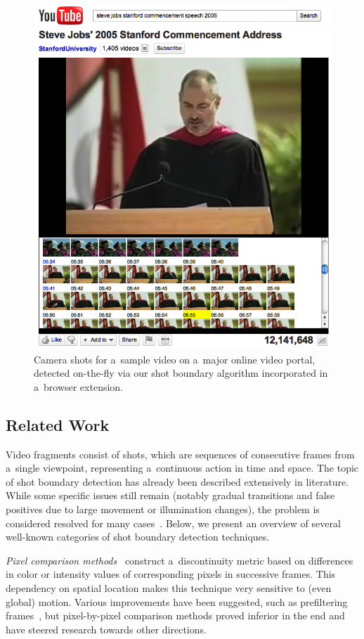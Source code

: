 \begin{figure}
  \begin{center}
    \includegraphics[width=0.7\linewidth]{./stevejobs.png}
  \end{center}
  \caption{Camera shots for a~sample video on 
    a~major online video portal, detected on-the-fly via
    our shot boundary algorithm incorporated
    in a~browser extension.}
  \label{fig:screenshot}
\end{figure}

\subsection{Related Work} \label{sec:related-work}
Video fragments consist of shots, which are sequences of
consecutive frames from a~single viewpoint,
representing a~continuous action in time and space.
The topic of shot boundary detection has already been described
extensively in literature.
While some specific issues still remain
(notably gradual transitions and false positives
due to large movement or illumination changes),
the problem is considered resolved for many
cases~\cite{yuan2007shotboundary,hanjalic2002shotboundary}.
Below, we present an overview of several well-known categories of shot boundary detection techniques.

\emph{Pixel comparison
methods}~\cite{hampapur1994videosegmentation,
zhang1993videopartitioning} construct a~discontinuity metric
based on differences in color or intensity values
of corresponding pixels in successive frames.
This dependency on spatial location makes this technique
very sensitive to (even global) motion.
Various improvements have been suggested, such as prefiltering
frames~\cite{zhang1995videoparsing},
but pixel-by-pixel comparison methods proved inferior in the end
and have steered research towards other directions.

